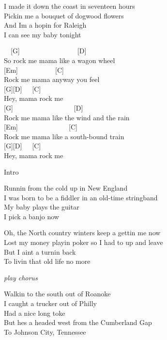\documentclass[
  letterpaper,
  a5paper]{memoir}
\begin{document}
I made it down the coast in seventeen hours\\
Pickin\textquotesingle{} me a bouquet of dogwood flowers\\
And I\textquotesingle m a hopin\textquotesingle{} for Raleigh\\
I can see my baby tonight

\begin{tcolorbox}[enhanced jigsaw, breakable, bottomrule=.15mm, colframe=quarto-callout-color-frame, rightrule=.15mm, opacityback=0, colback=white, arc=.35mm, toprule=.15mm, leftrule=.75mm, left=2mm]

~~{[}G{]}~~~~~~~~~~~~~~~~~{[}D{]}\\
So rock me mama like a wagon wheel\\
{[}Em{]}~~~~~~~~~~~{[}C{]}\\
Rock me mama anyway you feel\\
{[}G{]}{[}D{]}~~~{[}C{]}\\
Hey, mama rock me\\
{[}G{]}~~~~~~~~~~~~~~~~~~{[}D{]}\\
Rock me mama like the wind and the rain\\
{[}Em{]}~~~~~~~~~~~~~~~{[}C{]}\\
Rock me mama like a south-bound train\\
{[}G{]}{[}D{]}~~~{[}C{]}\\
Hey, mama rock me

\end{tcolorbox}

Intro

Runnin\textquotesingle{} from the cold up in New England\\
I was born to be a fiddler in an old-time stringband\\
My baby plays the guitar\\
I pick a banjo now

Oh, the North country winters keep a gettin\textquotesingle{} me now\\
Lost my money playin\textquotesingle{} poker so I had to up and leave\\
But I ain\textquotesingle t a turnin\textquotesingle{} back\\
To livin\textquotesingle{} that old life no more

\emph{play chorus}

Walkin\textquotesingle{} to the south out of Roanoke\\
I caught a trucker out of Philly\\
Had a nice long toke\\
But he\textquotesingle s a headed west from the Cumberland Gap\\
To Johnson City, Tennessee
\end{document}
